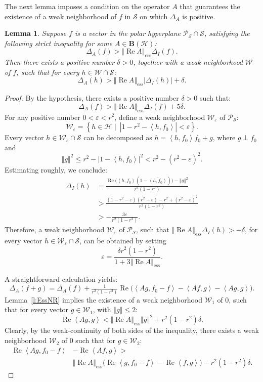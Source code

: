 \documentclass{tran-l}
\newtheorem{lem}[thm]{Lemma}
\theoremstyle{definition}
\theoremstyle{remark}
\numberwithin{equation}{subsection}
\DeclareMathOperator{\RE}{Re}
\DeclareMathOperator{\ess}{ess}
\newcommand{\eps}{\varepsilon}
\newcommand{\h}{\mathcal{H}}
\newcommand{\s}{\mathcal{S}}
\newcommand{\W}{\mathcal{W}}
\newcommand{\BH}{\mathbf{B}(\mathcal{H})}
\newcommand{\Polar}{\mathcal{P}_{\s}}
\newcommand{\abs}[1]{\left\vert#1\right\vert}
\newcommand{\set}[1]{\left\{#1\right\}}
\newcommand{\seq}[1]{\left<#1\right>}
\newcommand{\norm}[1]{\left\Vert#1\right\Vert}
\newcommand{\essnorm}[1]{\norm{#1}_{\ess}}
\begin{document}
The next lemma imposes a condition on the operator $A$ that guarantees the existence of a weak neighborhood of $f$ in $\s$ on which $\Delta_A$ is positive.

\begin{lem} \label{l:ESS}
Suppose $f$ is a vector in the polar hyperplane $\Polar\cap\s$, satisfying the following \emph{strict} inequality for some $A \in \BH$:
\[ \Delta_A(f) > \essnorm{\RE{A}} \Delta_I(f). \]
Then there exists a positive number $\delta>0$, together with a weak neighborhood $\W$ of $f$, such that for every $h\in\W\cap\s$:
\[ \Delta_A(h) > \essnorm{\RE{A}}\abs{\Delta_I(h)} + \delta. \]
\end{lem}

\begin{proof}
By the hypothesis, there exists a positive number $\delta>0$ such that:
\begin{equation}\label{e:EC1}
  \Delta_A(f) > \essnorm{\RE{A}}\Delta_I(f) + 5\delta.
\end{equation}
For any positive number $0<\eps<r^2$, define a weak neighborhood $\W_\eps$ of $\Polar$:
\[ \W_\eps = \set{h\in\h\,\,|\,\,\,\abs{1-r^2-\seq{h,f_0}} < \eps}. \]
Every vector $h\in\W_\eps\cap\s$ can be decomposed as $h=\seq{h,f_0}f_0+g$, where $g \perp f_0$ and
\[ \norm{g}^2 \leq r^2 - \abs{1-\seq{h,f_0}}^2 < r^2 - (r^2 -\eps)^2. \]
Estimating roughly, we conclude:
\begin{align*}
\Delta_I(h) &=
  \frac{\RE\big(\seq{h,f_0}(1-\overline{\seq{h,f_0}})\big)
    -\norm{g}^2}{r^2(1-r^2)}\\
  &> \frac{(1-r^2-\eps)(r^2-\eps)-r^2+(r^2-\eps)^2}{r^2(1-r^2)} \\
  &> -\frac{3\eps}{r^2(1-r^2)}.
\end{align*}
Therefore, a weak neighborhood $\W_\eps$ of $\Polar$, such that $\essnorm{\RE{A}} \Delta_I(h) > -\delta$, for every vector $h\in\W_\eps\cap\s$, can be obtained by setting
\[ \eps=\frac{\delta{r^2}(1-r^2)}{1+3\essnorm{\RE{A}}}. \]

A straightforward calculation yields:
\begin{equation}\label{e:EC2}
  \Delta_A(f+g) = \Delta_A(f) + \tfrac{1}{r^2(1-r^2)}
  \RE\big(\seq{A{g},f_0-f} - \seq{A{f},g} - \seq{A{g},g} \big).
\end{equation}
Lemma~\ref{l:EssNR} implies the existence of a weak neighborhood $\W_1$ of $0$, such that for every vector $g\in\W_1$, with $\norm{g}\leq2$:
\begin{equation}\label{e:EC3}
  \RE\seq{A g,g} < \essnorm{\RE{A}} \norm{g}^2 + r^2(1-r^2)\delta.
\end{equation}
Clearly, by the weak-continuity of both sides of the inequality, there exists a weak neighborhood $\W_2$ of $0$ such that for $g\in\W_2$:
\begin{equation}\label{e:EC4}
\begin{split}
  \RE\seq{A g,f_0-f} & - \RE\seq{A f,g} > \\ &
  \essnorm{\RE{A}}\big(\RE\seq{g,f_0-f}-\RE\seq{f,g}\big)
    -r^2(1-r^2)\delta.
\end{split}
\end{equation}


\end{proof}
\end{document}
